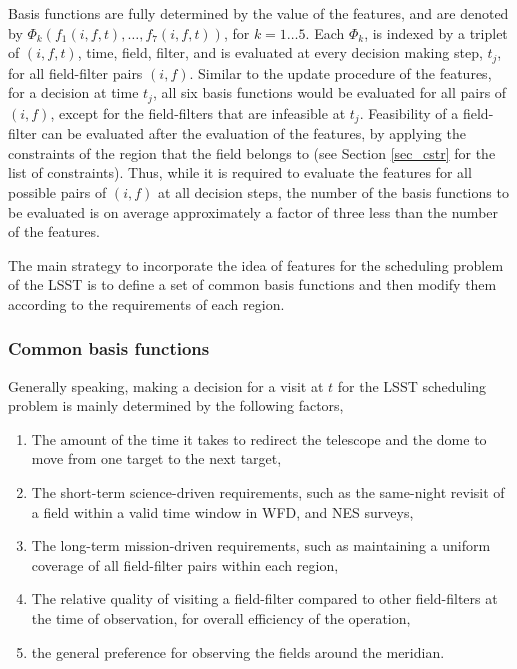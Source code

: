 \documentclass[12pt,aas_macros]{article}
\theoremstyle{definition}
\begin{document}
Basis functions are fully determined by the value of the features, and are denoted by $\Phi_k(f_1(i,f,t),\dots, f_7(i,f,t))$, for $k = 1 \dots 5$. Each $\Phi_k$, is indexed by a triplet of $(i,f,t)$, time, field, filter, and is evaluated at every decision making step, $t_j$, for all field-filter pairs $(i,f)$. Similar to the update procedure of the features, for a decision at time $t_j$, all six basis functions would be evaluated for all pairs of $(i,f)$, except for the field-filters that are infeasible at $t_j$. Feasibility of a field-filter can be evaluated after the evaluation of the features, by applying the constraints of the region that the field belongs to (see Section \ref{sec_cstr} for the list of constraints). Thus, while it is required to evaluate the features for all possible pairs of $(i,f)$ at all decision steps, the number of the basis functions to be evaluated is on average approximately a factor of three less than the number of the features.

The main strategy to incorporate the idea of features for the scheduling problem of the LSST is to define a  set of common basis functions and then modify them according to the requirements of each region. 


\subsubsection{Common basis functions}

Generally speaking, making a decision for a visit at $t$ for the LSST scheduling problem is mainly determined by the following factors,

\begin{enumerate}
\item The amount of the time it takes to redirect the telescope and the dome to move from one target to the next target,
\item The short-term science-driven requirements, such as the same-night revisit of a field within a valid time window in WFD, and NES surveys,
\item The long-term mission-driven requirements, such as maintaining a uniform coverage of all field-filter pairs within each region,
\item The relative quality of visiting a field-filter compared to other field-filters at the time of observation, for overall efficiency of the operation,
\item the general preference for observing the fields around the meridian.
\end{enumerate}
\end{document}
